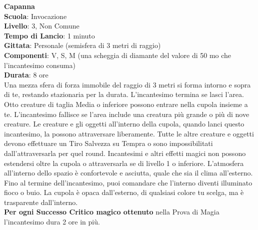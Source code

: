 \begin{multicols}{2}
\medskip\textbf{Capanna}\\
\textbf{Scuola}: Invocazione\\
\textbf{Livello}: 3, Non Comune\\
\textbf{Tempo di Lancio}: 1 minuto\\
\textbf{Gittata}: Personale (semisfera di 3 metri di raggio)\\
\textbf{Componenti}: V, S, M (una scheggia di diamante del valore di 50 mo che l'incantesimo consuma)\\
\textbf{Durata}: 8 ore\\
Una mezza sfera di forza immobile del raggio di 3 metri si forma intorno e sopra di te, restando stazionaria per la durata. L'incantesimo termina se lasci l'area. Otto creature di taglia Media o inferiore possono entrare nella cupola insieme a te. L'incantesimo fallisce se l'area include una creatura più grande o più di nove creature. Le creature e gli oggetti all'interno della cupola, quando lanci questo incantesimo, la possono attraversare liberamente. Tutte le altre creature e oggetti devono effettuare un Tiro Salvezza su Tempra o sono impossibilitati dall'attraversarla per quel round. Incantesimi e altri effetti magici non possono estendersi oltre la cupola o attraversarla se di livello 1 o inferiore. L'atmosfera all'interno dello spazio è confortevole e asciutta, quale che sia il clima all'esterno.\\
Fino al termine dell'incantesimo, puoi comandare che l'interno diventi illuminato fioco o buio. La cupola è opaca dall'esterno, di qualsiasi colore tu scelga, ma è trasparente dall'interno.\\
\textbf{Per ogni Successo Critico magico ottenuto} nella Prova di Magia l'incantesimo dura 2 ore in più.


\end{multicols}
